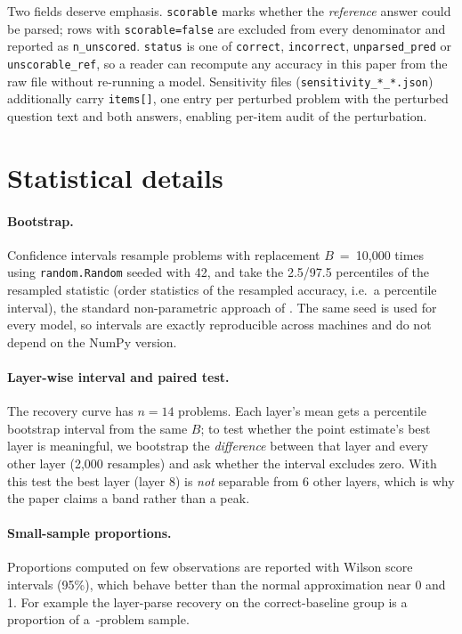 Two fields deserve emphasis. \texttt{scorable} marks whether the \emph{reference}
answer could be parsed; rows with \texttt{scorable=false} are excluded from every
denominator and reported as \texttt{n\_unscored}. \texttt{status} is one of
\texttt{correct}, \texttt{incorrect}, \texttt{unparsed\_pred} or
\texttt{unscorable\_ref}, so a reader can recompute any accuracy in this paper from
the raw file without re-running a model. Sensitivity files
(\texttt{sensitivity\_*\_*.json}) additionally carry \texttt{items[]}, one entry per
perturbed problem with the perturbed question text and both answers, enabling
per-item audit of the perturbation.

\section{Statistical details}
\label{app:stats}
\paragraph{Bootstrap.}
Confidence intervals resample problems with replacement $B$~=~10{,}000 times using
\texttt{random.Random} seeded with 42, and take the 2.5/97.5 percentiles of the
resampled statistic (order statistics of the resampled accuracy, i.e.\ a percentile
interval), the standard non-parametric approach of \citet{efron1993bootstrap}.
The same seed is used for every model, so intervals are exactly
reproducible across machines and do not depend on the NumPy version.

\paragraph{Layer-wise interval and paired test.}
The recovery curve has $n=14$ problems. Each layer's mean gets a
percentile bootstrap interval from the same $B$; to test whether the point estimate's
best layer is meaningful, we bootstrap the \emph{difference} between that layer and
every other layer (2{,}000 resamples) and ask whether the interval excludes zero.
With this test the best layer (layer 8) is \emph{not} separable
from 6 other layers, which is why the paper
claims a band rather than a peak.

\paragraph{Small-sample proportions.}
Proportions computed on few observations are reported with Wilson score intervals
(95\%), which behave better than the normal approximation near 0 and 1. For example the
layer-parse recovery on the correct-baseline group is a proportion of a~\nbCleanCorrect{}-problem sample.

